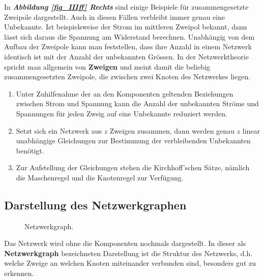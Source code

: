 \noindent In \textbf{\textit{Abbildung \ref{fig_IIIff} Rechts}} sind einige Beispiele für zusammengesetzte Zweipole dargestellt. Auch in diesen Fällen verbleibt immer genau eine Unbekannte. Ist beispielsweise der Strom im mittleren Zweipol bekannt, dann lässt sich daraus die Spannung am Widerstand berechnen. 
\newline\newline
Unabhängig von dem Aufbau der Zweipole kann man feststellen, dass ihre Anzahl in einem Netzwerk identisch ist mit der Anzahl der unbekannten Grössen. In der Netzwerktheorie spricht man allgemein von \textbf{Zweigen} und meint damit die beliebig zusammengesetzten Zweipole, die zwischen zwei Knoten des Netzwerkes liegen. 
\begin{enumerate}[$(i)$]
\item Unter Zuhilfenahme der an den Komponenten geltenden Beziehungen zwischen Strom und Spannung kann die Anzahl der unbekannten Ströme und Spannungen für jeden Zweig auf eine Unbekannte reduziert werden.
\item Setzt sich ein Netzwerk aus $z$ Zweigen zusammen, dann werden genau $z$ linear unabhängige Gleichungen zur Bestimmung der verbleibenden Unbekannten benötigt.
\item Zur Aufstellung der Gleichungen stehen die Kirchhoff'schen Sätze, nämlich die Maschenregel und die Knotenregel zur Verfügung.  
\end{enumerate}
\subsection{Darstellung des Netzwerkgraphen}
\begin{figure}[H]
\centering
\caption{Netzwerkgraph.}
\label{fig_IIIhh}
\end{figure}
Das Netzwerk wird ohne die Komponenten nochmals dargestellt. In dieser als \textbf{Netzwerkgraph} bezeichneten Darstellung ist die Struktur des Netzwerks, d.h. welche Zweige an welchen Knoten miteinander verbunden sind, besonders gut zu erkennen.
